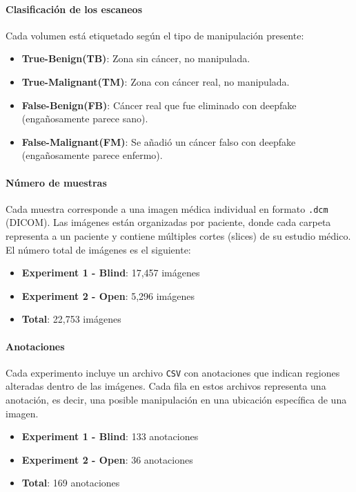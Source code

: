 \documentclass[conference]{IEEEtran}
\begin{document}
\paragraph{Clasificación de los escaneos}
Cada volumen está etiquetado según el tipo de manipulación presente:

\begin{itemize}
    \item \textbf{True-Benign(TB)}: Zona sin cáncer, no manipulada.
    \item \textbf{True-Malignant(TM)}: Zona con cáncer real, no manipulada.
    \item \textbf{False-Benign(FB)}: Cáncer real que fue eliminado con deepfake (engañosamente parece sano).
    \item \textbf{False-Malignant(FM)}: Se añadió un cáncer falso con deepfake (engañosamente parece enfermo).
\end{itemize}

\paragraph{Número de muestras}
Cada muestra corresponde a una imagen médica individual en formato \texttt{.dcm} (DICOM). Las imágenes están organizadas por paciente, donde cada carpeta representa a un paciente y contiene múltiples cortes (slices) de su estudio médico. El número total de imágenes es el siguiente:

\begin{itemize}
    \item \textbf{Experiment 1 - Blind}: 17,457 imágenes
    \item \textbf{Experiment 2 - Open}: 5,296 imágenes
    \item \textbf{Total}: 22,753 imágenes
\end{itemize}


\paragraph{Anotaciones}
Cada experimento incluye un archivo \texttt{CSV} con anotaciones que indican regiones alteradas dentro de las imágenes. Cada fila en estos archivos representa una anotación, es decir, una posible manipulación en una ubicación específica de una imagen.

\begin{itemize}
    \item \textbf{Experiment 1 - Blind}: 133 anotaciones
    \item \textbf{Experiment 2 - Open}: 36 anotaciones
    \item \textbf{Total}: 169 anotaciones
\end{itemize}
\end{document}
